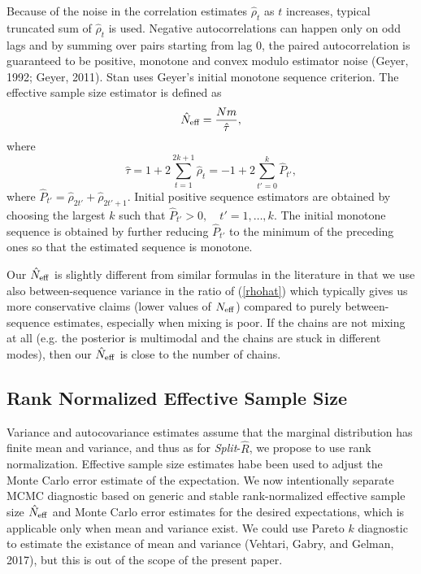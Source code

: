 \documentclass[11pt]{article}
\begin{document}
Because of the noise in the correlation estimates $\hat{\rho}_t$ as
$t$ increases, typical truncated sum of $\hat{\rho}_t$ is used.
Negative autocorrelations can happen only on odd lags and by summing
over pairs starting from lag 0, the paired autocorrelation is
guaranteed to be positive, monotone and convex modulo estimator noise
(Geyer, 1992; Geyer, 2011).  Stan uses Geyer's initial monotone
sequence criterion. The effective sample size estimator is defined as
\begin{equation}
\hat{N}_{\mbox{\scriptsize eff}}
= \frac{Nm}{\hat{\tau}},
\end{equation}
%
where
\begin{equation}
\hat{\tau} = 1 + 2 \sum_{t=1}^{2k+1} \hat{\rho}_t = 
-1 + 2 \sum_{t'=0}^{k} \hat{P}_{t'},
\end{equation}
where $\hat{P}_{t'}=\hat{\rho}_{2t'}+\hat{\rho}_{2t'+1}$. Initial
positive sequence estimators are obtained by choosing the largest $k$
such that $\hat{P}_{t'}>0, \quad t' = 1, \ldots, k$. The initial monotone
sequence is obtained by further reducing $\hat{P}_{t'}$ to the minimum
of the preceding ones so that the estimated sequence is monotone.

Our $\hat{N}_{\rm eff}$ is slightly different from similar formulas in the 
literature in that we use also between-sequence variance in the ratio of 
(\ref{rhohat}) which typically gives us more conservative claims (lower 
values of $N_{\rm eff}$) compared to purely between-sequence estimates, 
especially when mixing is poor. If the chains are not mixing at all (e.g.
the posterior is multimodal and the chains are stuck in different modes), 
then our $\hat{N}_{\rm eff}$ is close to the number of chains.

\subsection{Rank Normalized Effective Sample Size}

Variance and autocovariance estimates assume that the marginal
distribution has finite mean and variance, and thus as for 
{\em Split}-$\widehat{R}$, we propose to use rank
normalization. Effective sample size estimates habe been used to adjust
the Monte Carlo error estimate of the expectation. We now
intentionally separate MCMC diagnostic based on generic and stable
rank-normalized effective sample size $\hat{N}_{\rm eff}$ and Monte
Carlo error estimates for the desired expectations, which is
applicable only when mean and variance exist. We could use Pareto $k$
diagnostic to estimate the existance of mean and variance (Vehtari,
Gabry, and Gelman, 2017), but this is out of the scope of the present paper.
\end{document}
